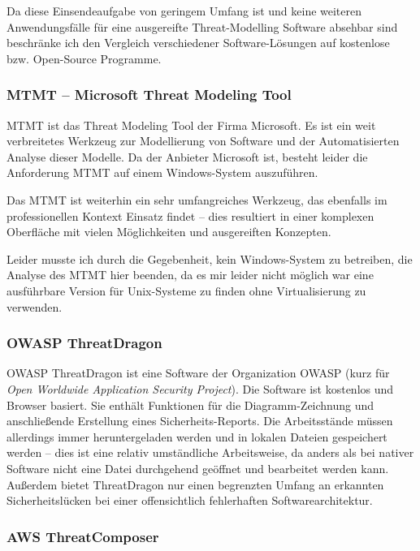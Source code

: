 \documentclass{article}
\begin{document}
Da diese Einsendeaufgabe von geringem Umfang ist und keine weiteren Anwendungsfälle für 
eine ausgereifte Threat-Modelling Software absehbar sind beschränke ich den Vergleich 
verschiedener Software-Lösungen auf kostenlose bzw. Open-Source Programme.

\subsubsection*{MTMT – Microsoft Threat Modeling Tool}

MTMT ist das Threat Modeling Tool der Firma Microsoft. Es ist ein weit verbreitetes 
Werkzeug zur Modellierung von Software und der Automatisierten Analyse dieser Modelle. Da 
der Anbieter Microsoft ist, besteht leider die Anforderung MTMT auf einem Windows-System 
auszuführen.

Das MTMT ist weiterhin ein sehr umfangreiches Werkzeug, das ebenfalls im professionellen 
Kontext Einsatz findet – dies resultiert in einer komplexen Oberfläche mit 
vielen Möglichkeiten und ausgereiften Konzepten.

Leider musste ich durch die Gegebenheit, kein Windows-System zu betreiben, die Analyse 
des MTMT hier beenden, da es mir leider nicht möglich war eine ausführbare Version für 
Unix-Systeme zu finden ohne Virtualisierung zu verwenden.

\subsubsection*{OWASP ThreatDragon}

OWASP ThreatDragon ist eine Software der Organization OWASP (kurz für \textit{Open 
Worldwide Application Security Project}). Die Software ist kostenlos und
Browser basiert. Sie enthält Funktionen für die Diagramm-Zeichnung und anschließende 
Erstellung eines Sicherheits-Reports. Die Arbeitsstände müssen allerdings immer 
heruntergeladen werden und in lokalen Dateien gespeichert werden – dies ist eine relativ 
umständliche Arbeitsweise, da anders als bei nativer Software nicht eine Datei durchgehend 
geöffnet und bearbeitet werden kann. Außerdem bietet ThreatDragon nur einen begrenzten 
Umfang an erkannten Sicherheitslücken bei einer offensichtlich fehlerhaften 
Softwarearchitektur.

\subsubsection*{AWS ThreatComposer}
\end{document}
